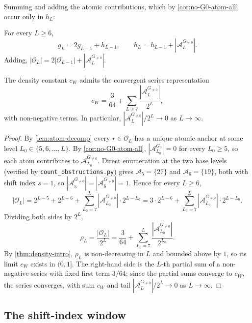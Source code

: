 \documentclass[11pt,reqno]{amsart}
\newcommand{\Obs}{\mathcal{O}}
\newcommand{\Atom}{\mathcal{A}}
\begin{document}
Summing and adding the atomic contributions, which by
\cref{cor:no-G0-atom-all} occur only in $h_L$:

\begin{corollary}
\label{cor:lift-balance}
For every $L \ge 6$,
\[
g_L = 2 g_{L-1} + h_{L-1}, \qquad h_L = h_{L-1} + |\Atom_L^{G_{\ne 0}}|.
\]
Adding, $|\Obs_L| = 2 |\Obs_{L-1}| + |\Atom_L^{G_{\ne 0}}|$.
\end{corollary}

\begin{theorem}\label{thm:series}
The density constant $c_W$ admits the convergent series representation
\[
c_W = \frac{3}{64} + \sum_{L \ge 7} \frac{|\Atom_L^{G_{\ne 0}}|}{2^L},
\]
with non-negative terms. In particular, $|\Atom_L^{G_{\ne 0}}|/2^L \to 0$ as
$L \to \infty$.
\end{theorem}

\begin{proof}
By \cref{lem:atom-decomp} every $r \in \Obs_L$ has a unique atomic
anchor at some level $L_0 \in \{5, 6, \ldots, L\}$. By
\cref{cor:no-G0-atom-all}, $|\Atom_{L_0}^{G_0}| = 0$ for every
$L_0 \ge 5$, so each atom contributes to $\Atom_{L_0}^{G_{\ne 0}}$.
Direct enumeration at the two base levels (verified by
\texttt{count\_obstructions.py}) gives $\Atom_5 = \{27\}$ and
$\Atom_6 = \{19\}$, both with shift index $s = 1$, so
$|\Atom_5^{G_{\ne 0}}| = |\Atom_6^{G_{\ne 0}}| = 1$. Hence for every $L \ge 6$,
\[
|\Obs_L| = 2^{L-5} + 2^{L-6} + \sum_{L_0 = 7}^{L} |\Atom_{L_0}^{G_{\ne 0}}| \cdot 2^{L - L_0}
        = 3 \cdot 2^{L-6} + \sum_{L_0 = 7}^{L} |\Atom_{L_0}^{G_{\ne 0}}| \cdot 2^{L - L_0}.
\]
Dividing both sides by $2^L$,
\[
\rho_L = \frac{|\Obs_L|}{2^L} = \frac{3}{64} + \sum_{L_0 = 7}^{L} \frac{|\Atom_{L_0}^{G_{\ne 0}}|}{2^{L_0}}.
\]
By \cref{thm:density-intro}, $\rho_L$ is non-decreasing in $L$ and
bounded above by $1$, so its limit $c_W$ exists in $(0, 1]$. The
right-hand side is the $L$-th partial sum of a non-negative series with
fixed first term $3/64$; since the partial sums converge to $c_W$, the
series converges, with sum $c_W$ and tail $|\Atom_L^{G_{\ne 0}}|/2^L \to 0$
as $L \to \infty$. \qedhere
\end{proof}

\subsection{The shift-index window}
\label{sec:shift-window}
\end{document}
